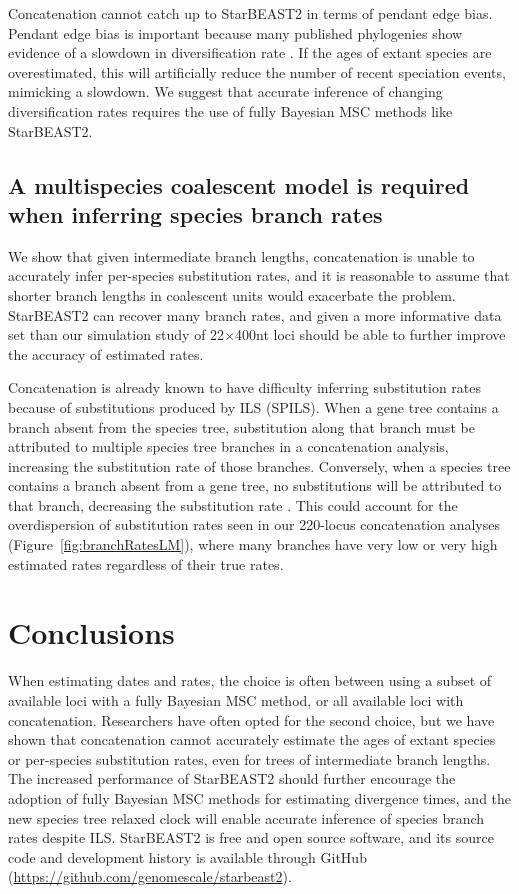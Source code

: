 \documentclass[12pt]{article}
\begin{document}
Concatenation cannot catch up to StarBEAST2 in terms of pendant edge bias.
Pendant edge bias is important because many published phylogenies show evidence
of a slowdown in diversification rate \citep{Moen2014190}. If the ages of extant
species are overestimated, this will artificially reduce the number of recent
speciation events, mimicking a slowdown. We suggest that accurate inference of
changing diversification rates requires the use of fully Bayesian MSC methods
like StarBEAST2.

\subsection*{A multispecies coalescent model is required when inferring species branch rates}

We show that given intermediate branch lengths, concatenation is unable to
accurately infer per-species substitution rates, and it is reasonable to assume
that shorter branch lengths in coalescent units would exacerbate the problem.
StarBEAST2 can recover many branch rates, and given a more informative data set
than our simulation study of 22$\times$400nt loci should be able to further improve
the accuracy of estimated rates.

Concatenation is already known to have difficulty inferring substitution rates
because of substitutions produced by ILS (SPILS). When a
gene tree contains a branch absent from the species tree, substitution along
that branch must be attributed to multiple species tree branches in a
concatenation analysis, increasing the substitution rate of those branches.
Conversely, when a species tree contains a branch absent from a gene tree, no
substitutions will be attributed to that branch, decreasing the substitution
rate \citep{Mendes28022016}. This could account for the overdispersion of
substitution rates seen in our 220-locus concatenation analyses
(Figure~\ref{fig:branchRatesLM}), where many branches have very low or very high
estimated rates regardless of their true rates.

\section*{Conclusions}

When estimating dates and rates, the choice is often between using a subset of
available loci with a fully Bayesian MSC method, or all available loci with
concatenation. Researchers have often opted for the second choice, but we have
shown that concatenation cannot accurately estimate the ages of extant species
or per-species substitution rates, even for trees of intermediate branch lengths. The
increased performance of StarBEAST2 should further encourage the adoption of
fully Bayesian MSC methods for estimating divergence times, and the new species
tree relaxed clock will enable accurate inference of species branch rates despite
ILS. StarBEAST2 is free and open source software, and its source code and
development history is available through GitHub
(\url{https://github.com/genomescale/starbeast2}).
\end{document}
